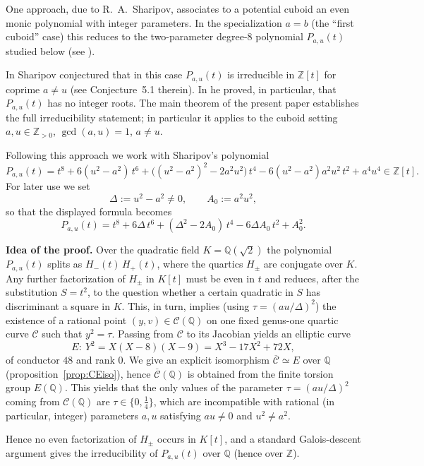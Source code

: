 \documentclass[12pt]{article}
\theoremstyle{remark}
\theoremstyle{definition}
\begin{document}
One approach, due to R.~A.~Sharipov, associates to a potential cuboid an even monic polynomial with integer parameters. In the specialization \(a=b\) (the ``first cuboid'' case) this reduces to the two-parameter degree-8 polynomial \(P_{a,u}(t)\) studied below (see \cite{Sharipov2011Cuboids,Sharipov2011Note}).

In \cite{Sharipov2011Cuboids} Sharipov conjectured that in this case \(P_{a,u}(t)\) is irreducible in \(\mathbb{Z}[t]\) for coprime \(a\neq u\) (see Conjecture~5.1 therein). In \cite{Sharipov2011Note} he proved, in particular, that \(P_{a,u}(t)\) has no integer roots. The main theorem of the present paper establishes the full irreducibility statement; in particular it applies to the cuboid setting \(a,u\in\mathbb{Z}_{>0}\), \(\gcd(a,u)=1\), \(a\neq u\).

Following this approach we work with Sharipov's polynomial
\[
P_{a,u}(t)=t^8+6(u^2-a^2)\,t^6+\bigl((u^2-a^2)^2-2a^2u^2\bigr)\,t^4-6(u^2-a^2)a^2u^2\,t^2+a^4u^4\in\mathbb{Z}[t].
\]
For later use we set
\[
\Delta:=u^2-a^2\neq0,\qquad A_0:=a^2u^2,
\]
so that the displayed formula becomes
\[
P_{a,u}(t)=t^8+6\Delta\,t^6+(\Delta^2-2A_0)\,t^4-6\Delta A_0\,t^2+A_0^2.
\]

\medskip
\noindent\textbf{Idea of the proof.}
Over the quadratic field \(K=\mathbb{Q}(\sqrt2)\) the polynomial \(P_{a,u}(t)\) splits as \(H_-(t)\,H_+(t)\), where the quartics \(H_\pm\) are conjugate over \(K\).
Any further factorization of \(H_\pm\) in \(K[t]\) must be even in \(t\) and reduces, after the substitution \(S=t^2\), to the question whether a certain quadratic in \(S\) has discriminant a square in \(K\).
This, in turn, implies (using \(\tau=(au/\Delta)^2\)) the existence of a rational point \((y,v)\in\mathcal{C}(\mathbb{Q})\) on one fixed genus-one quartic curve \(\mathcal{C}\) such that \(y^2=\tau\).
Passing from \(\mathcal{C}\) to its Jacobian yields an elliptic curve
\[
E:\ Y^2=X(X-8)(X-9)=X^3-17X^2+72X,
\]
of conductor \(48\) and rank \(0\).
We give an explicit isomorphism \(\overline{\mathcal{C}}\simeq E\) over \(\mathbb{Q}\) (proposition~\ref{prop:CEiso}), hence \(\overline{\mathcal{C}}(\mathbb{Q})\) is obtained from the finite torsion group \(E(\mathbb{Q})\).
This yields that the only values of the parameter \(\tau=(au/\Delta)^2\) coming from \(\mathcal{C}(\mathbb{Q})\) are \(\tau\in\{0,\tfrac14\}\), which are incompatible with rational (in particular, integer) parameters \(a,u\) satisfying \(au\neq0\) and \(u^2\neq a^2\).

Hence no even factorization of \(H_\pm\) occurs in \(K[t]\), and a standard Galois-descent argument gives the irreducibility of \(P_{a,u}(t)\) over \(\mathbb{Q}\) (hence over \(\mathbb{Z}\)).
\end{document}
